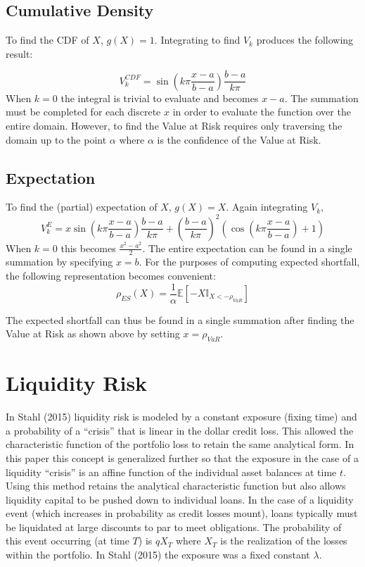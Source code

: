 \documentclass[12pt]{article}
\theoremstyle{definition}
\begin{document}
\subsection{Cumulative Density}

To find the CDF of \(X\), \(g(X)=1\).  Integrating to find \(V_k\) produces the following result:

\[V_k ^ {CDF}=\sin\left(k\pi \frac{x-a}{b-a}\right)\frac{b-a}{k\pi}\]
When \(k=0\) the integral is trivial to evaluate and becomes \(x-a\).  The summation must be completed for each discrete \(x\) in order to evaluate the function over the entire domain.  However, to find the Value at Risk requires only traversing the domain up to the point \(\alpha\) where \(\alpha\) is the confidence of the Value at Risk.  

\subsection{Expectation}

To find the (partial) expectation of \(X\), \(g(X)=X\).  Again integrating \(V_k\),
\[V_k ^{E}=x\sin \left(k\pi \frac{x-a}{b-a}\right)\frac{b-a}{k\pi}+\left(\frac{b-a}{k\pi}\right)^2 \left(\cos\left(k\pi \frac{x-a}{b-a}\right)+1\right)\]
When \(k=0\) this becomes \(\frac{x^2-a^2}{2}\).  The entire expectation can be found in a single summation by specifying \(x=b\).  For the purposes of computing expected shortfall, the following representation becomes convenient:
\[\rho_{ES}(X)=\frac{1}{\alpha}\mathbb{E}[-X \mathbb{I}_{X<-\rho_{VaR}}]\]

The expected shortfall can thus be found in a single summation after finding the Value at Risk as shown above by setting \(x=\rho_{VaR}\).



\section{Liquidity Risk} \label{riskContributions}
In Stahl (2015) liquidity risk is modeled by a constant exposure (fixing time) and a probability of a ``crisis'' that is linear in the dollar credit loss.  This allowed the characteristic function of the portfolio loss to retain the same analytical form.  In this paper this concept is generalized further so that the exposure in the case of a liquidity ``crisis'' is an affine function of the individual asset balances at time \(t\).  Using this method retains the analytical characteristic function but also allows liquidity capital to be pushed down to individual loans.  In the case of a liquidity event (which increases in probability as credit losses mount), loans typically must be liquidated at large discounts to par to meet obligations.  The probability of this event occurring (at time \(T\)) is \(q X_T\) where \(X_T\) is the realization of the losses within the portfolio.  In Stahl (2015) the exposure was a fixed constant \(\lambda\).  
\end{document}

